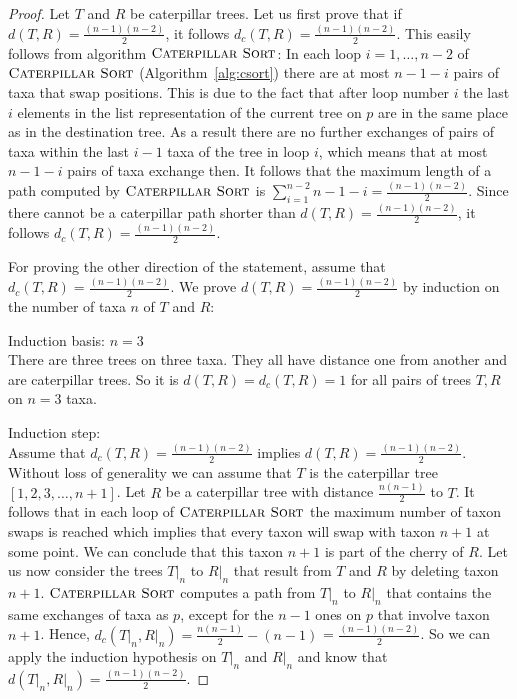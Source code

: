 \documentclass{amsart}
\newcommand{\csort}{\textsc{Caterpillar Sort}}
\begin{document}
\begin{proof}
Let $T$ and $R$ be caterpillar trees.
Let us first prove that if $d(T,R) = \frac{(n-1)(n-2)}{2}$, it follows $d_c(T,R) = \frac{(n-1)(n-2)}{2}$.
This easily follows from algorithm $\csort$:
In each loop $i=1, \ldots, n-2$ of $\csort$ (Algorithm~\ref{alg:csort}) there are at most $n-1-i$ pairs of taxa that swap positions.
This is due to the fact that after loop number $i$ the last $i$ elements in the list representation of the current tree on $p$ are in the same place as in the destination tree.
As a result there are no further exchanges of pairs of taxa within the last $i-1$ taxa of the tree in loop $i$, which means that at most $n-1-i$ pairs of taxa exchange then.
It follows that the maximum length of a path computed by $\csort$ is $\sum\limits_{i=1}^{n-2} n-1-i = \frac{(n-1)(n-2)}{2}$.
Since there cannot be a caterpillar path shorter than $d(T,R) = \frac{(n-1)(n-2)}{2}$, it follows $d_c(T,R) = \frac{(n-1)(n-2)}{2}$.

For proving the other direction of the statement, assume that $d_c(T,R) = \frac{(n-1)(n-2)}{2}$.
We prove $d(T,R) = \frac{(n-1)(n-2)}{2}$ by induction on the number of taxa $n$ of $T$ and $R$:

Induction basis: $n=3$\\
There are three trees on three taxa.
They all have distance one from another and are caterpillar trees.
So it is $d(T,R) = d_c(T,R) = 1$ for all pairs of trees $T,R$ on $n=3$ taxa.

Induction step:\\
Assume that $d_c(T,R) = \frac{(n-1)(n-2)}{2}$ implies $d(T,R) = \frac{(n-1)(n-2)}{2}$.\\
Without loss of generality we can assume that $T$ is the caterpillar tree $[1,2,3,\ldots,n+1]$.
Let $R$ be a caterpillar tree with distance $\frac{n(n-1)}{2}$ to $T$.
It follows that in each loop of $\csort$ the maximum number of taxon swaps is reached which implies that every taxon will swap with taxon $n+1$ at some point.
We can conclude that this taxon $n+1$ is part of the cherry of $R$.
Let us now consider the trees $T{\big|}_n$ to $R{\big|}_n$ that result from $T$ and $R$ by deleting taxon $n+1$.
$\csort$ computes a path from $T{\big|}_n$ to $R{\big|}_n$ that contains the same exchanges of taxa as $p$, except for the $n-1$ ones on $p$ that involve taxon $n+1$.
Hence, $d_c(T{\big|}_n, R{\big|}_n) = \frac{n(n-1)}{2} - (n-1)$ = $\frac{(n-1)(n-2)}{2}$.
So we can apply the induction hypothesis on $T{\big|}_n$ and $R{\big|}_n$ and know that $d(T{\big|}_n,R{\big|}_n) = \frac{(n-1)(n-2)}{2}$.


\end{proof}
\end{document}
